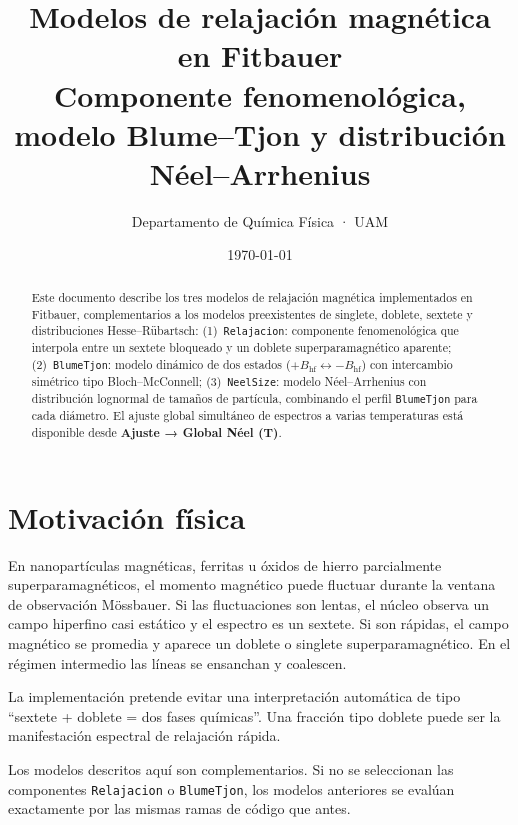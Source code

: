 \documentclass[11pt,a4paper]{article}
\title{\textbf{Modelos de relajación magnética en Fitbauer}\\[3pt]
\large Componente fenomenológica, modelo Blume--Tjon y distribución Néel--Arrhenius}
\author{Departamento de Química Física · UAM}
\date{\today}
\newcommand{\BHF}{B_{\mathrm{hf}}}
\newcommand{\code}[1]{\texttt{\small #1}}
\begin{document}
\maketitle

\begin{abstract}\noindent
Este documento describe los tres modelos de relajación magnética implementados
en Fitbauer, complementarios a los modelos preexistentes de singlete, doblete,
sextete y distribuciones Hesse--Rübartsch:
(1)~\code{Relajacion}: componente fenomenológica que interpola entre un sextete
bloqueado y un doblete superparamagnético aparente;
(2)~\code{BlumeTjon}: modelo dinámico de dos estados ($+\BHF \leftrightarrow -\BHF$)
con intercambio simétrico tipo Bloch--McConnell;
(3)~\code{NeelSize}: modelo Néel--Arrhenius con distribución lognormal de tamaños
de partícula, combinando el perfil \code{BlumeTjon} para cada diámetro.
El ajuste global simultáneo de espectros a varias temperaturas está disponible
desde \textbf{Ajuste → Global Néel (T)}.
\end{abstract}

\tableofcontents
\bigskip

\section{Motivación física}

En nanopartículas magnéticas, ferritas u óxidos de hierro parcialmente
superparamagnéticos, el momento magnético puede fluctuar durante la ventana de
observación Mössbauer. Si las fluctuaciones son lentas, el núcleo observa un
campo hiperfino casi estático y el espectro es un sextete. Si son rápidas, el
campo magnético se promedia y aparece un doblete o singlete superparamagnético.
En el régimen intermedio las líneas se ensanchan y coalescen.

La implementación pretende evitar una interpretación automática de tipo
``sextete + doblete = dos fases químicas''. Una fracción tipo doblete puede ser
la manifestación espectral de relajación rápida.

\begin{aviso}
Los modelos descritos aquí son complementarios. Si no se seleccionan las
componentes \code{Relajacion} o \code{BlumeTjon}, los modelos anteriores se
evalúan exactamente por las mismas ramas de código que antes.
\end{aviso}

\end{document}
